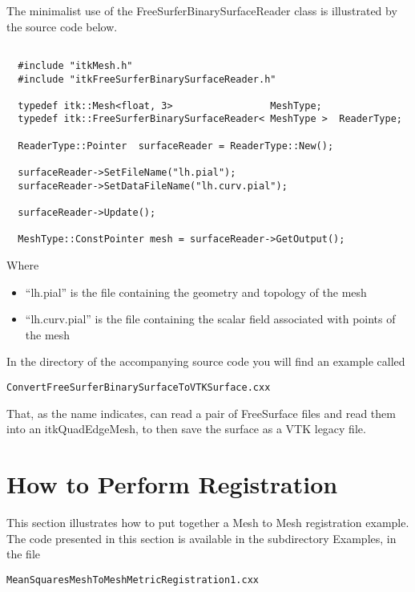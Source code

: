 \documentclass{InsightArticle}
\begin{document}
The minimalist use of the FreeSurferBinarySurfaceReader class is illustrated by
the source code below.


\begin{lstlisting}

  #include "itkMesh.h"
  #include "itkFreeSurferBinarySurfaceReader.h"

  typedef itk::Mesh<float, 3>                 MeshType;
  typedef itk::FreeSurferBinarySurfaceReader< MeshType >  ReaderType;

  ReaderType::Pointer  surfaceReader = ReaderType::New();

  surfaceReader->SetFileName("lh.pial");
  surfaceReader->SetDataFileName("lh.curv.pial");
  
  surfaceReader->Update();

  MeshType::ConstPointer mesh = surfaceReader->GetOutput();

\end{lstlisting}

Where 

\begin{itemize}
\item ``lh.pial'' is the file containing the geometry and topology of the mesh
\item ``lh.curv.pial'' is the file containing the scalar field associated with points of the mesh
\end{itemize}

In the  directory of the accompanying source code you will find an example called

\begin{verbatim} 
ConvertFreeSurferBinarySurfaceToVTKSurface.cxx
\end{verbatim} 

That, as the name indicates, can read a pair of FreeSurface files and read them
into an itkQuadEdgeMesh, to then save the surface as a VTK legacy file.


\section{How to Perform Registration}

This section illustrates how to put together a Mesh to Mesh registration
example. The code presented in this section is available in the subdirectory
Examples, in the file

\begin{verbatim} 
MeanSquaresMeshToMeshMetricRegistration1.cxx
\end{verbatim} 
\end{document}
